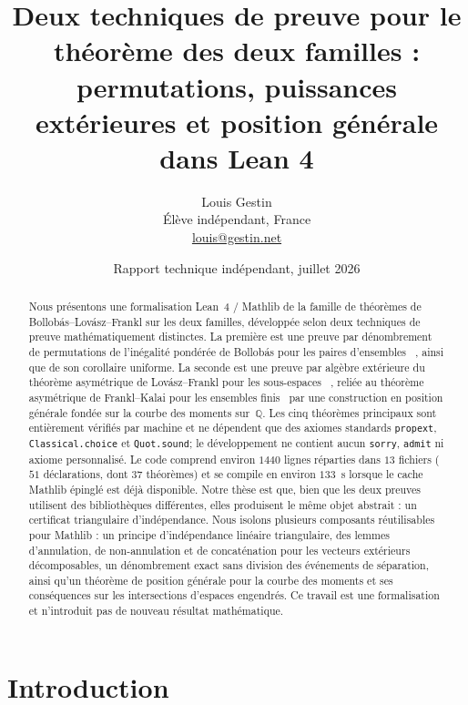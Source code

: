 \documentclass[11pt]{article}
\title{Deux techniques de preuve pour le théorème des deux familles :\\
permutations, puissances extérieures et position générale dans Lean 4}
\author{Louis Gestin\\\small Élève indépendant, France\\\small \href{mailto:louis@gestin.net}{louis@gestin.net}}
\date{Rapport technique indépendant, juillet 2026}
\newcommand{\QQ}{\mathbb{Q}}
\begin{document}
\maketitle

\begin{abstract}
Nous présentons une formalisation Lean~4 / Mathlib de la famille de théorèmes de
Bollobás--Lovász--Frankl sur les deux familles, développée selon deux techniques de
preuve mathématiquement distinctes. La première est une preuve par dénombrement de
permutations de l'inégalité pondérée de Bollobás pour les paires d'ensembles
~\cite{bollobas1965}, ainsi que de son corollaire uniforme. La seconde est une preuve par
algèbre extérieure du théorème asymétrique de Lovász--Frankl pour les sous-espaces
~\cite{lovasz1977}, reliée au théorème asymétrique de Frankl--Kalai pour les ensembles
finis~\cite{frankl1982,kalai1984} par une construction en position générale fondée sur
la courbe des moments sur~$\QQ$. Les cinq théorèmes principaux sont entièrement vérifiés
par machine et ne dépendent que des axiomes standards \texttt{propext},
\texttt{Classical.choice} et \texttt{Quot.sound}; le développement ne contient aucun
\texttt{sorry}, \texttt{admit} ni axiome personnalisé. Le code comprend environ $1440$
lignes réparties dans $13$ fichiers ($51$ déclarations, dont $37$ théorèmes) et se
compile en environ $133$~s lorsque le cache Mathlib épinglé est déjà disponible. Notre
thèse est que, bien que les deux preuves utilisent des bibliothèques différentes, elles
produisent le même objet abstrait : un certificat triangulaire d'indépendance. Nous
isolons plusieurs composants réutilisables pour Mathlib : un principe d'indépendance
linéaire triangulaire, des lemmes d'annulation, de non-annulation et de concaténation
pour les vecteurs extérieurs décomposables, un dénombrement exact sans division des
événements de séparation, ainsi qu'un théorème de position générale pour la courbe des
moments et ses conséquences sur les intersections d'espaces engendrés. Ce travail est
une formalisation et n'introduit pas de nouveau résultat mathématique.
\end{abstract}

\section{Introduction}\label{sec:intro}
\end{document}

